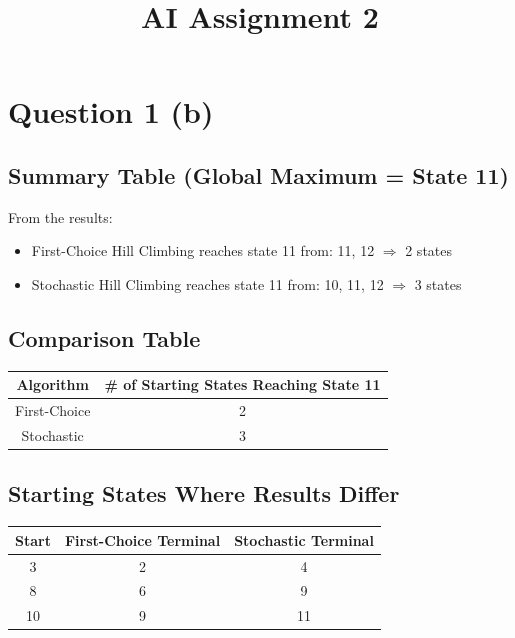 \documentclass[12pt]{article}
\title{AI Assignment 2}
\author{}
\date{}
\begin{document}
\maketitle

\section{Question 1 (b)}

\subsection{Summary Table (Global Maximum = State 11)}

From the results:

\begin{itemize}
    \item First-Choice Hill Climbing reaches state 11 from: 11, 12 $\Rightarrow$ 2 states
    \item Stochastic Hill Climbing reaches state 11 from: 10, 11, 12 $\Rightarrow$ 3 states
\end{itemize}

\subsection{Comparison Table}

\begin{center}
\begin{tabular}{|c|c|}
\hline
\textbf{Algorithm} & \textbf{\# of Starting States Reaching State 11} \\
\hline
First-Choice & 2 \\
\hline
Stochastic & 3 \\
\hline
\end{tabular}
\end{center}

\subsection{Starting States Where Results Differ}

\begin{center}
\begin{tabular}{|c|c|c|}
\hline
\textbf{Start} & \textbf{First-Choice Terminal} & \textbf{Stochastic Terminal} \\
\hline
3 & 2 & 4 \\
\hline
8 & 6 & 9 \\
\hline
10 & 9 & 11 \\
\hline
\end{tabular}
\end{center}
\end{document}
